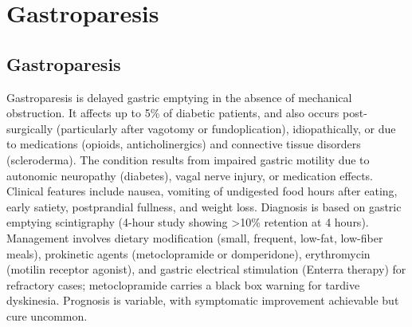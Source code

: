 \section{Gastroparesis}








\label{sec:section:Gastroparesis}

\subsection{Gastroparesis}
\label{sec:Gastroparesis}
Gastroparesis is delayed gastric emptying in the absence of mechanical obstruction. It affects up to 5\% of diabetic patients, and also occurs post-surgically (particularly after vagotomy or fundoplication), idiopathically, or due to medications (opioids, anticholinergics) and connective tissue disorders (scleroderma). The condition results from impaired gastric motility due to autonomic neuropathy (diabetes), vagal nerve injury, or medication effects. Clinical features include nausea, vomiting of undigested food hours after eating, early satiety, postprandial fullness, and weight loss. Diagnosis is based on gastric emptying scintigraphy (4-hour study showing >10\% retention at 4 hours). Management involves dietary modification (small, frequent, low-fat, low-fiber meals), prokinetic agents (metoclopramide or domperidone), erythromycin (motilin receptor agonist), and gastric electrical stimulation (Enterra therapy) for refractory cases; metoclopramide carries a black box warning for tardive dyskinesia. Prognosis is variable, with symptomatic improvement achievable but cure uncommon.

